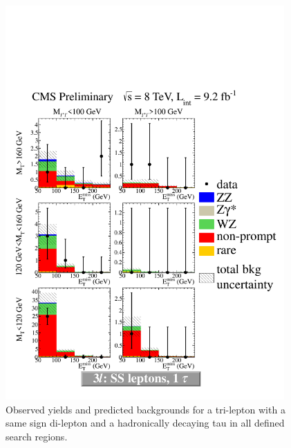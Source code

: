 \begin{figure}[htp]
\begin{center}
\includegraphics[width=0.95\textwidth]{plots/3lfinal/ossf0tau1.pdf}
\caption{Observed yields and predicted backgrounds for a tri-lepton with a same sign di-lepton 
and a hadronically decaying tau in all defined search regions.}
\label{fig:SStau1}
\end{center}
\end{figure}
